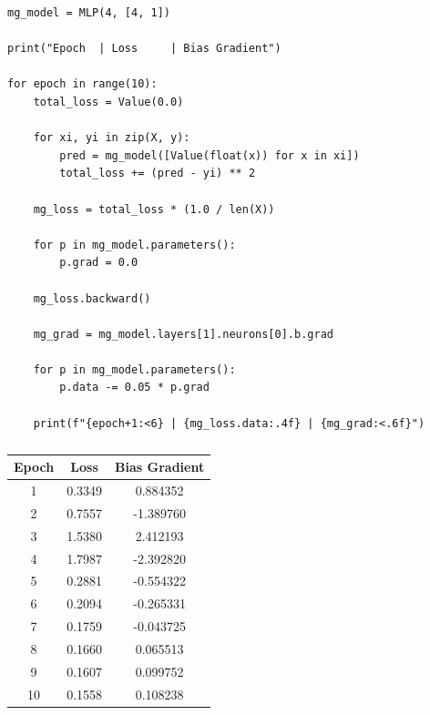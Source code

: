 \documentclass[12pt]{article}
\begin{document}
\begin{lstlisting}
mg_model = MLP(4, [4, 1])

print("Epoch  | Loss     | Bias Gradient")

for epoch in range(10):
    total_loss = Value(0.0)

    for xi, yi in zip(X, y):
        pred = mg_model([Value(float(x)) for x in xi])
        total_loss += (pred - yi) ** 2

    mg_loss = total_loss * (1.0 / len(X))

    for p in mg_model.parameters():
        p.grad = 0.0

    mg_loss.backward()

    mg_grad = mg_model.layers[1].neurons[0].b.grad

    for p in mg_model.parameters():
        p.data -= 0.05 * p.grad

    print(f"{epoch+1:<6} | {mg_loss.data:.4f} | {mg_grad:<.6f}")
\end{lstlisting}
\begin{table}[h]
\centering
\begin{tabular}{ccc}
\hline
Epoch & Loss & Bias Gradient \\
\hline
1  & 0.3349 & 0.884352 \\
2  & 0.7557 & -1.389760 \\
3  & 1.5380 & 2.412193 \\
4  & 1.7987 & -2.392820 \\
5  & 0.2881 & -0.554322 \\
6  & 0.2094 & -0.265331 \\
7  & 0.1759 & -0.043725 \\
8  & 0.1660 & 0.065513 \\
9  & 0.1607 & 0.099752 \\
10 & 0.1558 & 0.108238 \\
\hline
\end{tabular}
\caption{}
\label{tab:micrograd_training}
\end{table}
\end{document}
